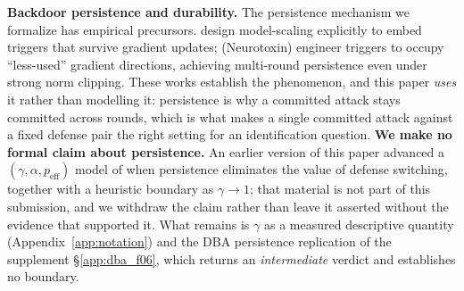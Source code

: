 \documentclass{article}
\begin{document}
\textbf{Backdoor persistence and durability.} The persistence mechanism we formalize has empirical precursors. \citet{bagdasaryan2020backdoor} design model-scaling explicitly to embed triggers that survive gradient updates; \citet{zhang2022neurotoxin} (Neurotoxin) engineer triggers to occupy ``less-used'' gradient directions, achieving multi-round persistence even under strong norm clipping. These works establish the phenomenon, and this paper \emph{uses} it rather than modelling it: persistence is why a committed attack stays committed across rounds, which is what makes a single committed attack against a fixed defense pair the right setting for an identification question. \textbf{We make no formal claim about persistence.} An earlier version of this paper advanced a $(\gamma, \alpha, p_{\mathrm{eff}})$ model of when persistence eliminates the value of defense switching, together with a heuristic boundary as $\gamma \to 1$; that material is not part of this submission, and we withdraw the claim rather than leave it asserted without the evidence that supported it. What remains is $\gamma$ as a measured descriptive quantity (Appendix~\ref{app:notation}) and the DBA persistence replication of the supplement §\ref{app:dba_f06}, which returns an \emph{intermediate} verdict and establishes no boundary.
\end{document}
